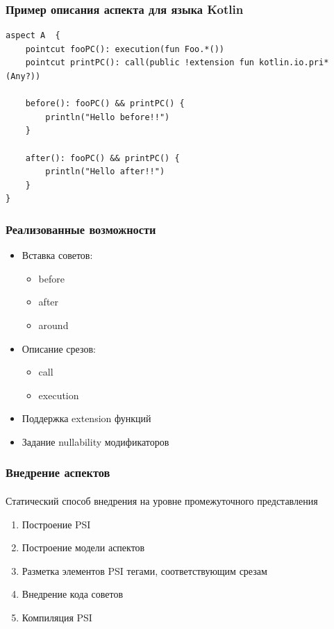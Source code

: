 \documentclass[hyperref={pdftex,unicode}]{beamer}
\begin{document}
\begin{frame}[fragile=singleslide]
	\frametitle{Пример описания аспекта для языка Kotlin}
	\begin{lstlisting}[frame=single,style=base]
aspect A  {
    pointcut fooPC(): execution(fun Foo.*())
    pointcut printPC(): call(public !extension fun kotlin.io.pri*(Any?))

    before(): fooPC() && printPC() {
        println("Hello before!!")
    }

    after(): fooPC() && printPC() {
        println("Hello after!!")
    }
}
	\end{lstlisting}
\end{frame}

\begin{frame}[fragile=singleslide]
	\frametitle{Реализованные возможности}
			
	\begin{itemize}
		\item Вставка советов:
		      \begin{itemize}
		      	\item before
		      	\item after
		      	\item around
		      \end{itemize}
		\item Описание срезов:
		      \begin{itemize}
		      	\item call
		      	\item execution
		      \end{itemize}
		\item Поддержка extension функций
		\item Задание nullability модификаторов
	\end{itemize}
\end{frame}

\begin{frame}[fragile=singleslide]
	\frametitle{Внедрение аспектов}
	\framesubtitle{}
	Статический способ внедрения на уровне промежуточного представления
	
	\begin{enumerate}
		\item Построение PSI
		\item Построение модели аспектов
		\item Разметка элементов PSI тегами, соответствующим срезам
		\item Внедрение кода советов
		\item Компиляция PSI
	\end{enumerate}
\end{frame}
\end{document}
